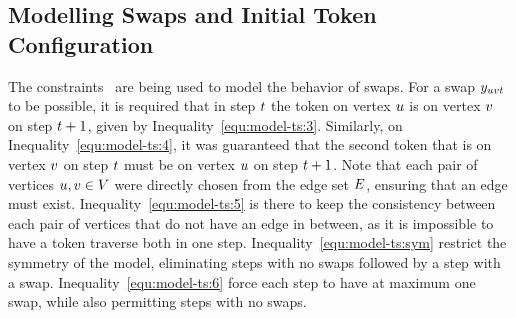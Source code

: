 \documentclass[msc,english,table,xcdraw]{ppgccufmg}
\begin{document}




\subsection{Modelling Swaps and Initial Token Configuration}
\label{sec:formulation_ts:swaps}

The constraints~ are being used to 
model the behavior of swaps.
For a swap $y_{uvt}$ to be possible, it is required that in step $t$ 
the token on vertex $u$ is on vertex $v$ on step $t+1$, 
given by Inequality~\ref{equ:model-ts:3}.
Similarly, on Inequality~\ref{equ:model-ts:4}, it was guaranteed that the second 
token that is on vertex $v$ on step $t$ must be on vertex 
$u$ on step $t+1$.
Note that each pair of vertices $u,v \in V$ were 
directly chosen from the edge set $E$, ensuring that an edge must exist.
Inequality~\ref{equ:model-ts:5} is there to keep the consistency between each 
pair of vertices that do not have an edge in between, as it is impossible to have 
a token traverse both in one step.
Inequality~\ref{equ:model-ts:sym} restrict the symmetry of the model, eliminating
steps with no swaps followed by a step with a swap.
Inequality~\ref{equ:model-ts:6} force each step to have at maximum one swap, 
while also permitting steps with no swaps.
\end{document}
